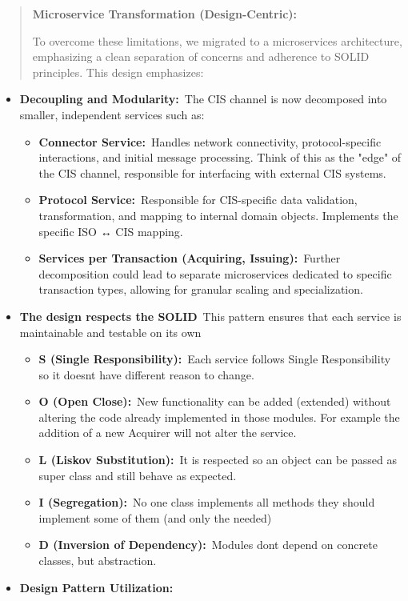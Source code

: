 \documentclass[12pt,a4paper]{report}
\begin{document}
\begin{quote}
\textbf{Microservice Transformation (Design-Centric):}

To overcome these limitations, we migrated to a microservices
architecture, emphasizing a clean separation of concerns and adherence
to SOLID principles. This design emphasizes:
\end{quote}

\begin{itemize}
\item
  \textbf{Decoupling and Modularity:}~The CIS channel is now decomposed
  into smaller, independent services such as:

  \begin{itemize}
  \item
    \textbf{Connector Service:}~Handles network connectivity,
    protocol-specific interactions, and initial message processing.
    Think of this as the "edge" of the CIS channel, responsible for
    interfacing with external CIS systems.
  \item
    \textbf{Protocol Service:}~Responsible for CIS-specific data
    validation, transformation, and mapping to internal domain objects.
    Implements the specific ISO ↔ CIS mapping.
  \item
    \textbf{Services per Transaction (Acquiring, Issuing):}~Further
    decomposition could lead to separate microservices dedicated to
    specific transaction types, allowing for granular scaling and
    specialization.
  \end{itemize}
\item
  \textbf{The design respects the SOLID}~This pattern ensures that each
  service is maintainable and testable on its own

  \begin{itemize}
  \item
    \textbf{S (Single Responsibility):}~Each service follows Single
    Responsibility so it doesn\textquotesingle t have different reason
    to change.
  \item
    \textbf{O (Open Close):}~New functionality can be added (extended)
    without altering the code already implemented in those modules. For
    example the addition of a new Acquirer will not alter the service.
  \item
    \textbf{L (Liskov Substitution):}~It is respected so an object can
    be passed as super class and still behave as expected.
  \item
    \textbf{I (Segregation):}~No one class implements all methods they
    should implement some of them (and only the needed)
  \item
    \textbf{D (Inversion of Dependency):}~Modules don\textquotesingle t
    depend on concrete classes, but abstraction.
  \end{itemize}
\item
  \textbf{Design Pattern Utilization:}


\end{itemize}
\end{document}
